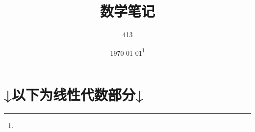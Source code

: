 \documentclass{note}
\title{数学笔记}
\author{413}
\date{{\builddatemonth\today}\protect\footnote{\text{Build \builddate\today}}}%
\renewcommand{\thefootnote}{\fnsymbol{footnote}}
\begin{document}
\maketitle

\renewcommand{\thefootnote}{\arabic{footnote}}
\setcounter{footnote}{0}
\setcounter{tocdepth}{2}%

\tableofcontents

\newpage












\newpage

\section{↓以下为线性代数部分↓}












\end{document}
